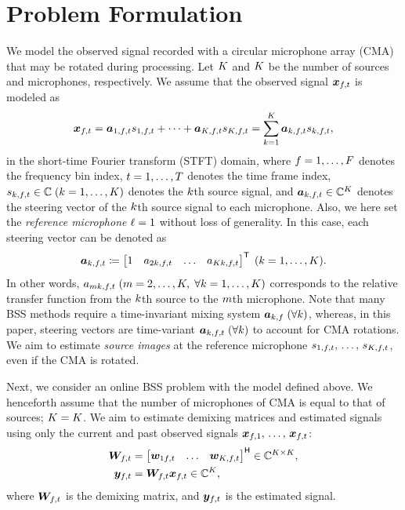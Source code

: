 \documentclass[sip,biber]{now-journal}
\begin{document}
\section{Problem Formulation}\label{sec:problem}
We model the observed signal recorded with a circular microphone array (CMA) that may be rotated during processing.
Let $K$ and $\Mic$ be the number of sources and microphones, respectively.
We assume that the observed signal $\Obs _{\ft}$ is modeled as
\begin{equation}
  \Obs _{\ft} = \steer _{1,\ft} \sig _{1,\ft} + \dots + \steer _{\Src,\ft} \sig _{\Src,\ft} = \sum _{\src=1} ^{\Src} \steer _{\src,\ft} \sig _{\src,\ft},\label{eq:mix}
\end{equation}
in the short-time Fourier transform (STFT) domain,
where $f = 1, \dots, F$ denotes the frequency bin index,
$t = 1, \dots, T$ denotes the time frame index,
$\sig _{\src,\ft} \in \C\; (\src = 1, \dots, \Src)$ denotes the $k$th source signal,
and $\steer _{\src,\ft} \in \C ^{\Mic}$ denotes the steering vector of the $k$th source signal to each microphone.
Also, we here set the \emph{reference microphone} $\ell = 1$ without loss of generality.
In this case, each steering vector can be denoted as
\begin{equation}
  \steer _{\src,\ft} \coloneqq \begin{bmatrix} 1 & \str _{2\src,\ft} & \dots & \str _{\Mic\src,\ft} \end{bmatrix} ^{\top}\; (\src = 1, \dots, \Src).
\end{equation}
In other words, $\str _{\mic\src,\ft} \; (\mic = 2, \dots, \Mic,\; \forall \src = 1, \dots, \Src)$ corresponds to the relative transfer function from the $k$th source to the $m$th microphone.
Note that many BSS methods require a time-invariant mixing system $\bm{a} _{k,f}\; (\forall k)$,
whereas, in this paper, steering vectors are time-variant $\steer _{\src,\ft}\; (\forall \src)$ to account for CMA rotations.
We aim to estimate \emph{source images} at the reference microphone $\sig _{1,\ft},\, \dots,\, \sig _{\Src,\ft}$, even if the CMA is rotated.

Next, we consider an online BSS problem with the model defined above.
We henceforth assume that the number of microphones of CMA is equal to that of sources; $\Mic = \Src$.
\renewcommand{\Mic}{\Src}%
We aim to estimate demixing matrices and estimated signals using only the current and past observed signals $\bm{x} _{f,1},\, \dots,\, \bm{x} _{f,t}$:
\begin{align}
  \Demix _{\ft} &= \begin{bmatrix} \demix _{1\ft} & \dots & \demix _{\Src,\ft} \end{bmatrix} ^{\hermite} \in \C ^{\Src \times \Mic}, \\
  \Est _{\ft} &= \Demix _{\ft} \Obs _{\ft} \in \C ^{\Src},
\end{align}
where $\Demix _{\ft}$ is the demixing matrix, and $\Est _{\ft}$ is the estimated signal.
\end{document}
